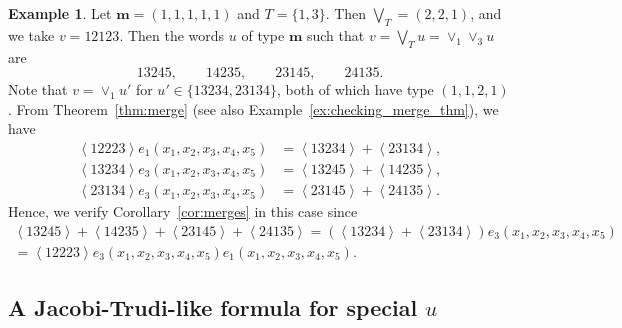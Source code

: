 \documentclass[reqno]{amsart}
\newcommand{\0}{\phantom{c}}
\newcommand{\swt}[1]{\left\langle #1 \right\rangle} %
\newcommand{\mm}{\mathbf{m}}
\theoremstyle{plain}
\theoremstyle{definition}
\newtheorem{example}[thm]{Example}
\numberwithin{equation}{section}
\begin{document}
\begin{example}
Let $\mm = (1,1,1,1,1)$ and $T = \{1,3\}$.
Then $\bigvee_T = (2,2,1)$, and we take $v = 12123$.
Then the words $u$ of type $\mm$ such that $v = \bigvee_T u = \vee_1 \vee_3 u$ are
\[
13245,
\qquad
14235,
\qquad
23145,
\qquad
24135.
\]
Note that $v = \vee_1 u'$ for $u' \in \{13234, 23134\}$, both of which have type $(1, 1, 2, 1)$.
From Theorem~\ref{thm:merge} (see also Example~\ref{ex:checking_merge_thm}), we have
\begin{align*}
\swt{12223} e_1(x_1, x_2, x_3, x_4, x_5) & = \swt{13234} + \swt{23134},
\\
\swt{13234} e_3(x_1, x_2, x_3, x_4, x_5) & = \swt{13245} + \swt{14235},
\\
\swt{23134} e_3(x_1, x_2, x_3, x_4, x_5) & = \swt{23145} + \swt{24135}.
\end{align*}
Hence, we verify Corollary~\ref{cor:merges} in this case since
\begin{gather*}
\swt{13245} + \swt{14235} + \swt{23145} + \swt{24135}
 = (\swt{13234} + \swt{23134}) e_3(x_1, x_2, x_3, x_4, x_5)
\\ = \swt{12223} e_3(x_1, x_2, x_3, x_4, x_5) e_1(x_1, x_2, x_3, x_4, x_5).
\end{gather*}
\end{example}


\subsection{A Jacobi-Trudi-like formula for special \texorpdfstring{$u$}{u}}
\label{subsec:JT_formula}
\end{document}
